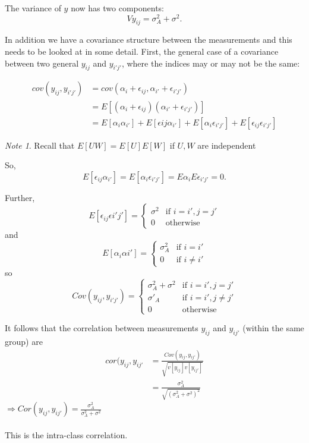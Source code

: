 \documentclass[12pt,a4paper]{article}
\theoremstyle{regla}
\theoremstyle{remark}
\newtheorem{notes}{Note}[section]
\theoremstyle{definition}
\theoremstyle{nonumberbreak}
\begin{document}
The variance of $y$ now has two components:
$$Vy_{ij}=\sigma^2_A + \sigma^2.$$


In addition we have a covariance structure between the measurements and this needs to be looked at in some detail. First, the general case of a covariance between two general $y_{ij}$ and $y_{i'j'}$, where the indices may or may not be the same:

\begin{eqnarray*}
cov(y_{ij},y_{i'j'}) &=cov(\alpha_i+\epsilon_{ij}, \alpha_{i'}+ \epsilon_{i'j'})\\
                     &=E[(\alpha_i+\epsilon_{ij})(\alpha_{i'}+\epsilon_{i'j'})]\\
                     &=E[\alpha_i\alpha_{i'}] + E[\epsilon{ij}\alpha_{i'}]+ E[\alpha_i\epsilon_{i'j'}] + E[\epsilon_{ij}\epsilon_{i'j'}]
\end{eqnarray*}

\begin{notes}
Recall that $E[UW]=E[U]E[W]$ if $U,W$ are independent
\end{notes}

So,
$$E[\epsilon_{ij}\alpha_{i'}]=E[\alpha_i\epsilon_{i'j'}] = E\alpha_iE\epsilon_{i'j'}=0 .$$

Further,
$$E[\epsilon_{ij}\epsilon{i'j'}] = \left\{ \begin{array}{rl}
\sigma^2 &\mbox {if $i=i', j=j'$}\\
0 &\mbox {otherwise} 
\end{array} \right.$$
and
$$ E[\alpha_{i}\alpha{i'}] = \left\{ \begin{array}{rl}
\sigma^2_A &\mbox {if $i=i'$}\\
0 &\mbox {if $i \neq i'$} 
\end{array} \right. $$
so
$$ Cov(y_{ij},y_{i'j'}) = \left\{ \begin{array}{rl}
\sigma_A^2+\sigma^2 &\mbox {if $i=i', j=j'$}\\
\sigma'_A &\mbox {if $i=i', j \neq j'$}\\
0 &\mbox {otherwise}
\end{array} \right. $$

It follows that the correlation between measurements $y_{ij}$ and $y_{ij'}$ (within the same group) are
\begin{align*}
cor(y_{ij},y_{ij'} &= \frac{Cov(y_{ij},y_{ij'})}{\sqrt{v[y_{ij}]v[y_{ij'}]}}\\
                   &= \frac{\sigma_A^2}{\sqrt{(\sigma_A^2 + \sigma^2)^2}}
\end{align*}
$\Rightarrow Cor(y_{ij}, y_{ij'}) = \frac{\sigma_A^2}{\sigma_A^2 + \sigma^2}$\\
\\
This is the intra-class correlation.
\end{document}
